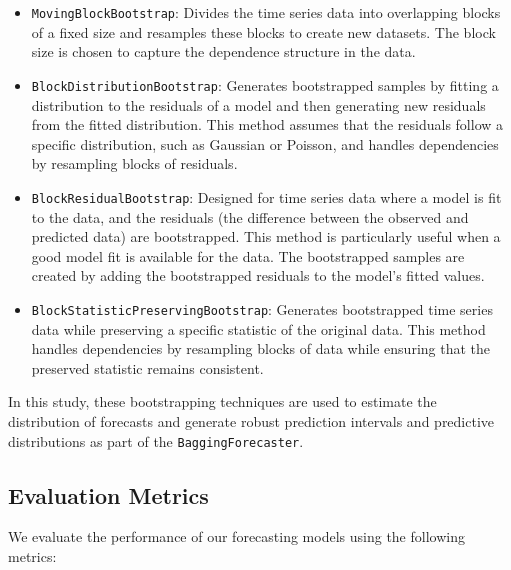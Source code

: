 \begin{itemize}
    \item \texttt{MovingBlockBootstrap}: Divides the time series data into overlapping blocks of a fixed size and resamples these blocks to create new datasets. The block size is chosen to capture the dependence structure in the data.
    \item \texttt{BlockDistributionBootstrap}: Generates bootstrapped samples by fitting a distribution to the residuals of a model and then generating new residuals from the fitted distribution. This method assumes that the residuals follow a specific distribution, such as Gaussian or Poisson, and handles dependencies by resampling blocks of residuals.
    \item \texttt{BlockResidualBootstrap}: Designed for time series data where a model is fit to the data, and the residuals (the difference between the observed and predicted data) are bootstrapped. This method is particularly useful when a good model fit is available for the data. The bootstrapped samples are created by adding the bootstrapped residuals to the model's fitted values.
    \item \texttt{BlockStatisticPreservingBootstrap}: Generates bootstrapped time series data while preserving a specific statistic of the original data. This method handles dependencies by resampling blocks of data while ensuring that the preserved statistic remains consistent.
\end{itemize}

In this study, these bootstrapping techniques are used to estimate the distribution of forecasts and generate robust prediction intervals and predictive distributions as part of the \texttt{BaggingForecaster}.

\subsection{Evaluation Metrics}
We evaluate the performance of our forecasting models using the following metrics:

